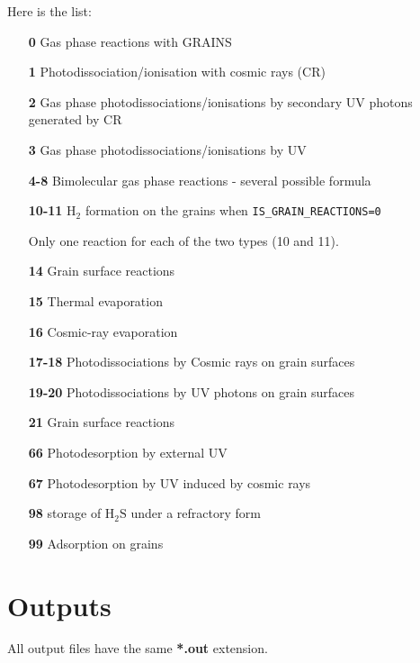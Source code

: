\documentclass[english,a4paper,twoside]{article}
\newcommand{\molecule}[1]{\ensuremath{\mathrm{#1}}}
\begin{document}
Here is the list:
\begin{itemize}
\item[\textbf{0}] Gas phase reactions with GRAINS
\item[\textbf{1}] Photodissociation/ionisation with cosmic rays (CR)
\item[\textbf{2}] Gas phase photodissociations/ionisations by secondary UV photons generated by CR
\item[\textbf{3}] Gas phase photodissociations/ionisations by UV
\item[\textbf{4-8}] Bimolecular gas phase reactions - several possible formula 
\item[\textbf{10-11}] \molecule{H_2} formation on the grains when \verb|IS_GRAIN_REACTIONS=0|
\begin{remarque}
Only one reaction for each of the two types (10 and 11).
\end{remarque}
\item[\textbf{14}] Grain surface reactions
\item[\textbf{15}] Thermal evaporation
\item[\textbf{16}] Cosmic-ray evaporation
\item[\textbf{17-18}] Photodissociations by Cosmic rays on grain surfaces
\item[\textbf{19-20}] Photodissociations by UV photons on grain surfaces
\item[\textbf{21}] Grain surface reactions
\item[\textbf{66}] Photodesorption by external UV
\item[\textbf{67}] Photodesorption by UV induced by cosmic rays
\item[\textbf{98}] storage of $\molecule{H_2S}$ under a refractory form
\item[\textbf{99}] Adsorption on grains
\end{itemize}

\section{Outputs}\label{sec:output-files}
\begin{attention}
All output files have the same \textbf{*.out} extension.
\end{attention}
\end{document}
